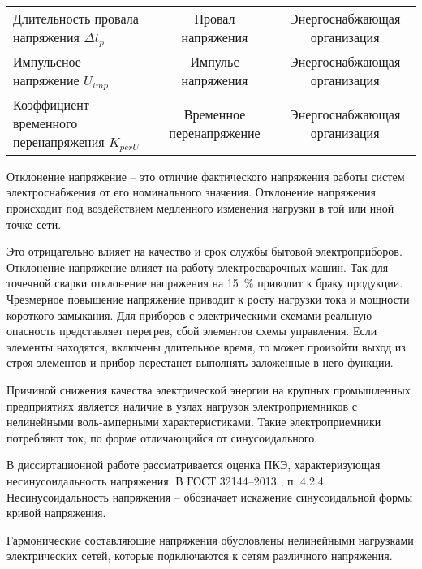 \begin{table} [p]
\begin{SingleSpace}
\begin{tabulary}{\textwidth}{@{}>{\zz}L >{\zz}C >{\zz}C @{}}
			Длительность провала напряжения ${\Delta t_p}$ & %
			Провал напряжения &
			Энергоснабжающая организация \\
			
			Импульсное напряжение ${U_{imp}}$ &
			Импульс напряжения &
			Энергоснабжающая организация \\
			
			Коэффициент временного перенапряжения ${K_{per U}}$ &
			Временное перенапряжение &
			Энергоснабжающая организация \\
			
			\bottomrule %
		\end{tabulary}%
	\end{SingleSpace}
\end{table}

Отклонение напряжение -- это отличие фактического напряжения работы систем электроснабжения от его номинального значения. Отклонение напряжения происходит под воздействием медленного изменения нагрузки в той или иной точке сети. 

Это отрицательно влияет на качество и срок службы бытовой электроприборов. Отклонение напряжение влияет на работу электросварочных машин. Так для точечной сварки отклонение напряжения на 15~\% приводит к браку продукции. Чрезмерное повышение напряжение приводит к росту нагрузки тока и мощности короткого замыкания. Для приборов с электрическими схемами реальную опасность представляет перегрев, сбой элементов схемы управления. Если элементы находятся, включены длительное время, то может произойти выход из строя элементов и прибор перестанет выполнять заложенные в него функции.



Причиной снижения качества электрической энергии на крупных промышленных предприятиях является наличие в узлах нагрузок электроприемников с нелинейными воль-амперными характеристиками. \cite{Accounting_Higher_harmonics_Plans_2013, Modeling_Questions_Lyutarevich2013}
Такие электроприемники потребляют ток, по форме отличающийся от синусоидального. 

В диссиртационной работе рассматривается оценка ПКЭ, характеризующая несинусоидальность напряжения. В ГОСТ 32144--2013 \cite{GOST32144-2013}, п. 4.2.4 Несинусоидальность напряжения -- обозначает искажение синусоидальной формы кривой напряжения.

Гармонические составляющие напряжения обусловлены нелинейными нагрузками электрических сетей, которые подключаются к сетям различного напряжения. 

